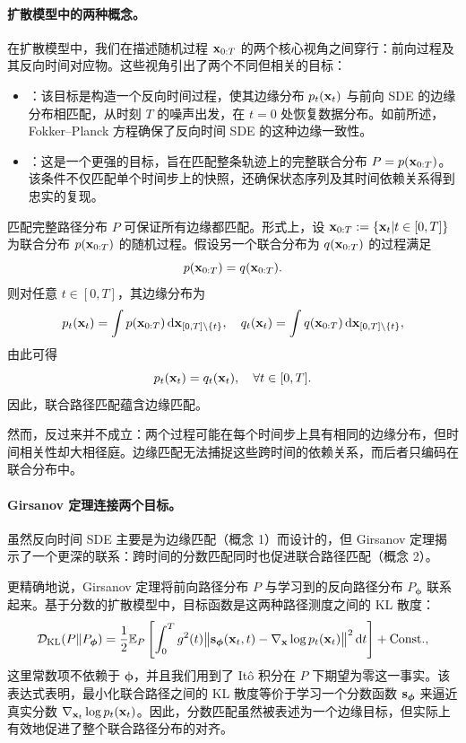 \paragraph{扩散模型中的两种概念。}
在扩散模型中，我们在描述随机过程 ${\mathbf{x}}_{0:T}$ 的两个核心视角之间穿行：前向过程及其反向时间对应物。这些视角引出了两个不同但相关的目标：
\begin{itemize}
    \item {}：该目标是构造一个反向时间过程，使其边缘分布 $p_t({\mathbf{x}}_t)$ 与前向 SDE 的边缘分布相匹配，从时刻 $T$ 的噪声出发，在 $t=0$ 处恢复数据分布。如前所述，Fokker–Planck 方程确保了反向时间 SDE 的这种边缘一致性。
    \item {}：这是一个更强的目标，旨在匹配整条轨迹上的完整联合分布 $P = p({\mathbf{x}}_{0:T})$。该条件不仅匹配单个时间步上的快照，还确保状态序列及其时间依赖关系得到忠实的复现。
\end{itemize}

匹配完整路径分布 $P$ 可保证所有边缘都匹配。形式上，设 ${\mathbf{x}}_{0:T} := \{{\mathbf{x}}_t|t \in [0,T]\}$ 为联合分布 $p({\mathbf{x}}_{0:T})$ 的随机过程。假设另一个联合分布为 $q({\mathbf{x}}_{0:T})$ 的过程满足
$$ p({\mathbf{x}}_{0:T}) = q({\mathbf{x}}_{0:T}). $$
则对任意 $t \in [0,T]$，其边缘分布为
\begin{align*}
p_t({\mathbf{x}}_t) = \int p({\mathbf{x}}_{0:T})  \mathop{}\!\mathrm{d}{\mathbf{x}}_{[0,T]\setminus \{t\}}, \quad 
q_t({\mathbf{x}}_t) = \int q({\mathbf{x}}_{0:T})  \mathop{}\!\mathrm{d}{\mathbf{x}}_{[0,T]\setminus \{t\}},
\end{align*}
由此可得
$$ p_t({\mathbf{x}}_t) = q_t({\mathbf{x}}_t), \quad \forall t \in [0,T]. $$
因此，联合路径匹配蕴含边缘匹配。

然而，反过来并不成立：两个过程可能在每个时间步上具有相同的边缘分布，但时间相关性却大相径庭。边缘匹配无法捕捉这些跨时间的依赖关系，而后者只编码在联合分布中。


\paragraph{Girsanov 定理连接两个目标。}
虽然反向时间 SDE 主要是为边缘匹配（概念 1）而设计的，但 Girsanov 定理揭示了一个更深的联系：跨时间的分数匹配同时也促进联合路径匹配（概念 2）。

更精确地说，Girsanov 定理将前向路径分布 $P$ 与学习到的反向路径分布 $P_{\bm{\phi}}$ 联系起来。基于分数的扩散模型中，目标函数是这两种路径测度之间的 KL 散度：
\begin{align}\label{eq:girsanov-KL} \mathcal{D}_{\mathrm{KL}}(P  \|  P_{\bm{\phi}}) =  \frac{1}{2} \mathbb{E}_{P} \left[\int_{0}^{T} g^2(t) \big\|{\mathbf{s}}_{\bm{\phi}}({\mathbf{x}}_t,t) - \nabla_{{\mathbf{x}}}\log p_t({\mathbf{x}}_t)\big\|^2 \mathop{}\!\mathrm{d} t\right] + \mathrm{Const.}, \end{align}
这里常数项不依赖于 $\bm{\phi}$，并且我们用到了 It\^o 积分在 $P$ 下期望为零这一事实。该表达式表明，最小化联合路径之间的 KL 散度等价于学习一个分数函数 ${\mathbf{s}}_{\bm{\phi}}$ 来逼近真实分数 $\nabla_{{\mathbf{x}}_t} \log p_t({\mathbf{x}}_t)$。因此，分数匹配虽然被表述为一个边缘目标，但实际上有效地促进了整个联合路径分布的对齐。

